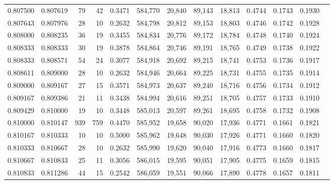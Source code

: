 \begin{tabular}{rrrrrrrrrrrrr}
0.807500 & 0.807619 &    79 &  42 &                                     0.3471 & 584,770 &  20,840 &  89,143 &  18,813 & 0.4744 & 0.1743 & 0.1930 \\
0.807643 & 0.807976 &    28 &  10 &                                     0.2632 & 584,798 &  20,812 &  89,153 &  18,803 & 0.4746 & 0.1742 & 0.1928 \\
0.808000 & 0.808235 &    36 &  19 &                                     0.3455 & 584,834 &  20,776 &  89,172 &  18,784 & 0.4748 & 0.1740 & 0.1924 \\
0.808333 & 0.808333 &    30 &  19 &                                     0.3878 & 584,864 &  20,746 &  89,191 &  18,765 & 0.4749 & 0.1738 & 0.1922 \\
0.808333 & 0.808571 &    54 &  24 &                                     0.3077 & 584,918 &  20,692 &  89,215 &  18,741 & 0.4753 & 0.1736 & 0.1917 \\
0.808611 & 0.809000 &    28 &  10 &                                     0.2632 & 584,946 &  20,664 &  89,225 &  18,731 & 0.4755 & 0.1735 & 0.1914 \\
0.809000 & 0.809167 &    27 &  15 &                                     0.3571 & 584,973 &  20,637 &  89,240 &  18,716 & 0.4756 & 0.1734 & 0.1912 \\
0.809167 & 0.809386 &    21 &  11 &                                     0.3438 & 584,994 &  20,616 &  89,251 &  18,705 & 0.4757 & 0.1733 & 0.1910 \\
0.809429 & 0.810000 &    19 &  10 &                                     0.3448 & 585,013 &  20,597 &  89,261 &  18,695 & 0.4758 & 0.1732 & 0.1908 \\
0.810000 & 0.810147 &   939 & 759 &                                     0.4470 & 585,952 &  19,658 &  90,020 &  17,936 & 0.4771 & 0.1661 & 0.1821 \\
0.810167 & 0.810333 &    10 &  10 &                                     0.5000 & 585,962 &  19,648 &  90,030 &  17,926 & 0.4771 & 0.1660 & 0.1820 \\
0.810333 & 0.810667 &    28 &  10 &                                     0.2632 & 585,990 &  19,620 &  90,040 &  17,916 & 0.4773 & 0.1660 & 0.1817 \\
0.810667 & 0.810833 &    25 &  11 &                                     0.3056 & 586,015 &  19,595 &  90,051 &  17,905 & 0.4775 & 0.1659 & 0.1815 \\
0.810833 & 0.811286 &    44 &  15 &                                     0.2542 & 586,059 &  19,551 &  90,066 &  17,890 & 0.4778 & 0.1657 & 0.1811 \\

\end{tabular}
